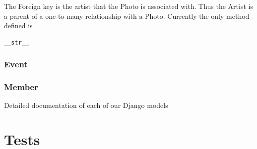 \documentclass[12pt,english]{article}
\begin{document}
The Foreign key is the artist that the Photo is associated with. Thus the Artist is a parent
of a one-to-many relationship with a Photo. Currently the only method defined is 
\begin{verbatim}
__str__ 
\end{verbatim} 

\subsubsection{Event}

\subsubsection{Member}

Detailed documentation of each of our Django models
\section{Tests}
\end{document}

